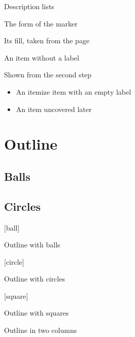 \documentclass[aspectratio=169]{beamer}
\begin{document}
{
\begin{frame}{Description lists}
  \begin{description}
    \item[Shape] The form of the marker
    \item[Colour] Its fill, taken from the page
    \item[] An item without a label
    \item<2->[Later] Shown from the second step
  \end{description}
  \begin{itemize}
    \item[] An itemize item with an empty label
    \item<2-> An item uncovered later
  \end{itemize}
\end{frame}
}

\section{Outline}
\subsection{Balls}
\subsection{Circles}

{
[ball]
\begin{frame}{Outline with balls}
  \tableofcontents
\end{frame}
}

{
[circle]
\begin{frame}{Outline with circles}
  \tableofcontents
\end{frame}
}

{
[square]
\begin{frame}{Outline with squares}
  \tableofcontents[currentsection]
\end{frame}
}

\begin{frame}{Outline in two columns}
  \begin{columns}[T]
    \tableofcontents[sections={1-2}]
    \tableofcontents[sections={3-4}]
  \end{columns}
\end{frame}
\end{document}
